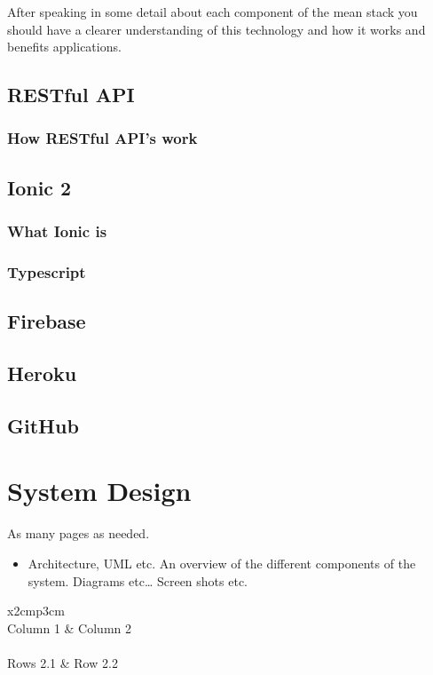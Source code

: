 After speaking in some detail about each component of the mean stack you should have a clearer understanding of this technology and how it works and benefits applications.  


\section{RESTful API}

\subsection {How RESTful API's work}


\section{Ionic 2}



\subsection{ What Ionic is }


\subsection {Typescript}

\section{Firebase}


\section{Heroku}

\section{GitHub}

\chapter{System Design}
As many pages as needed.
\begin{itemize}
\item Architecture, UML etc. An overview of the different components of the system. Diagrams etc… Screen shots etc.
\end{itemize}

\begin{table}[h]
  \centering
  \begin{tabular}{x{2cm}p{3cm}}
    \toprule \\
    Column 1 & Column 2 \\
    \midrule \\
    Rows 2.1 & Row 2.2 \\
    \bottomrule
  \end{tabular}
  \caption{A table.}
  \label{table:mytable}
\end{table}

